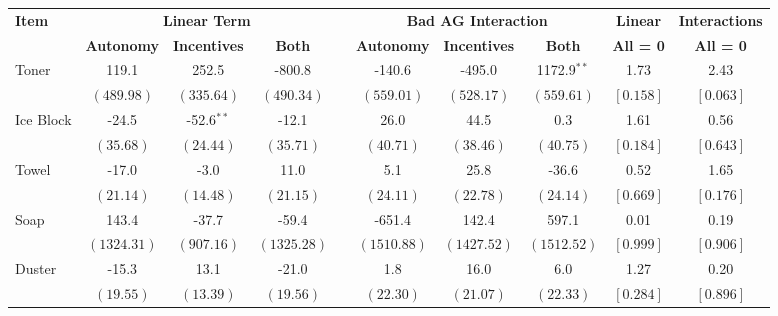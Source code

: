 \begin{tabular}{lccccccccc}
\toprule
\multirow{2}{*}{\textbf{Item}} & \multicolumn{3}{c}{\textbf{Linear Term}} & & \multicolumn{3}{c}{\textbf{Bad AG Interaction}} & \textbf{Linear} & \textbf{Interactions} \\ 
 & \textbf{Autonomy} & \textbf{Incentives} & \textbf{Both} & & \textbf{Autonomy} & \textbf{Incentives} & \textbf{Both} & \textbf{All = 0} & \textbf{All = 0} \\ 
\midrule
 \multirow{2}{*}{Toner}  &  119.1 &  252.5 & -800.8 &  & -140.6 & -495.0 & 1172.9$^{**}$ &   1.73 &   2.43 \\ 
 & $ \left(489.98\right) $  & $ \left(335.64\right) $  & $ \left(490.34\right) $ &  & $ \left(559.01\right) $  & $ \left(528.17\right) $  & $ \left(559.61\right) $  & $ \left[ 0.158\right] $  & $ \left[ 0.063\right] $  \\ [0.25em] 
 \multirow{2}{*}{Ice Block}  &  -24.5 &  -52.6$^{**}$ &  -12.1 &  &   26.0 &   44.5 &    0.3 &   1.61 &   0.56 \\ 
 & $ \left( 35.68\right) $  & $ \left( 24.44\right) $  & $ \left( 35.71\right) $ &  & $ \left( 40.71\right) $  & $ \left( 38.46\right) $  & $ \left( 40.75\right) $  & $ \left[ 0.184\right] $  & $ \left[ 0.643\right] $  \\ [0.25em] 
 \multirow{2}{*}{Towel}  &  -17.0 &   -3.0 &   11.0 &  &    5.1 &   25.8 &  -36.6 &   0.52 &   1.65 \\ 
 & $ \left( 21.14\right) $  & $ \left( 14.48\right) $  & $ \left( 21.15\right) $ &  & $ \left( 24.11\right) $  & $ \left( 22.78\right) $  & $ \left( 24.14\right) $  & $ \left[ 0.669\right] $  & $ \left[ 0.176\right] $  \\ [0.25em] 
 \multirow{2}{*}{Soap}  &  143.4 &  -37.7 &  -59.4 &  & -651.4 &  142.4 &  597.1 &   0.01 &   0.19 \\ 
 & $ \left(1324.31\right) $  & $ \left(907.16\right) $  & $ \left(1325.28\right) $ &  & $ \left(1510.88\right) $  & $ \left(1427.52\right) $  & $ \left(1512.52\right) $  & $ \left[ 0.999\right] $  & $ \left[ 0.906\right] $  \\ [0.25em] 
 \multirow{2}{*}{Duster}  &  -15.3 &   13.1 &  -21.0 &  &    1.8 &   16.0 &    6.0 &   1.27 &   0.20 \\ 
 & $ \left( 19.55\right) $  & $ \left( 13.39\right) $  & $ \left( 19.56\right) $ &  & $ \left( 22.30\right) $  & $ \left( 21.07\right) $  & $ \left( 22.33\right) $  & $ \left[ 0.284\right] $  & $ \left[ 0.896\right] $  \\ [0.25em] 

\end{tabular}
